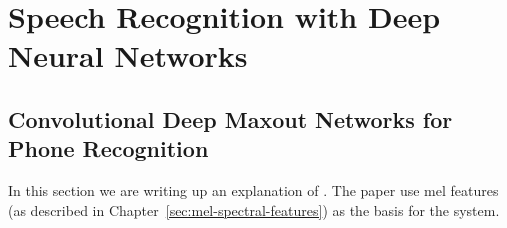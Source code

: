 \chapter{Speech Recognition with Deep Neural Networks}

\section{Convolutional Deep Maxout Networks for Phone Recognition}
In this section we are writing up an explanation of 
\cite{toth2014convolutional}.  The paper use mel features
(as described in Chapter~\ref{sec:mel-spectral-features})
as the basis for the system.
